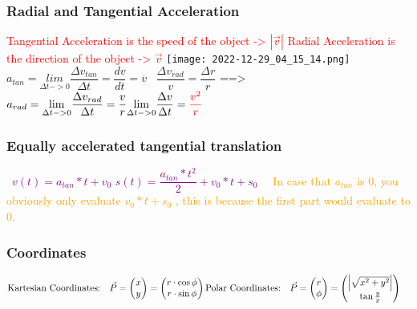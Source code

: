 \documentclass[main.tex,fontsize=8pt,paper=a4,paper=portrait,DIV=calc,]{scrartcl}
\begin{document}
\begin{multicols*}{2}
\subsubsection{Radial and Tangential Acceleration}
\textcolor{red}{Tangential Acceleration is the speed of the object -> \(|\vec{v}|\)}\newline
\textcolor{red}{Radial Acceleration is the direction of the object -> \(\vec{v}\)}\newline
\texttt{[image: 2022-12-29\_04\_15\_14.png]}\newline
\, \newline
\large \( a_{tan} = \underset{\Delta t -> 0}{lim} \dfrac{\Delta v_{tan}}{\Delta t} = \dfrac{dv}{dt} = \overset{.}{v} \) \newline
\, \newline
\large \( \dfrac{\Delta v_{rad}}{v} = \dfrac{\Delta r}{r}\) ==> \( a_{rad} = \underset{\Delta t -> 0}{\lim} \dfrac{\Delta v_{rad}}{\Delta t} = \dfrac{v}{r}\underset{\Delta t -> 0}{\lim} \dfrac{\Delta v}{\Delta t} = \textcolor{red}{\dfrac{v^2}{r}} \) \newline
\, \newline \normalsize

\subsubsection{Equally accelerated tangential translation}
\, \newline
\large \textcolor{purple}{\( v(t) = a_{tan} * t + v_0 \)}\newline
\large \textcolor{purple}{\( s(t) = \dfrac{a_{tan} * t^2}{2} + v_0 * t + s_0\)} \newline
\, \newline \normalsize \
\textcolor{orange}{In case that \(a_{tan}\) is 0, you obviously only evaluate \(v_0 * t + s_0\) , this is because the first part would evaluate to 0.}

\subsubsection{Coordinates}
\(\text{Kartesian Coordinates:} \quad\vec{P}= \begin{pmatrix}x\\y \end{pmatrix} = \begin{pmatrix}r\cdot \cos\phi\\ r\cdot \sin\phi\end{pmatrix}\quad \newline
\text{Polar Coordinates:} \quad\vec{P}= \begin{pmatrix}r\\ \phi \end{pmatrix} = \begin{pmatrix}\left|\sqrt{x^2+y^2}\right|\\ \tan\frac{y}{x}\end{pmatrix}\quad\)


\end{multicols*}
\end{document}
